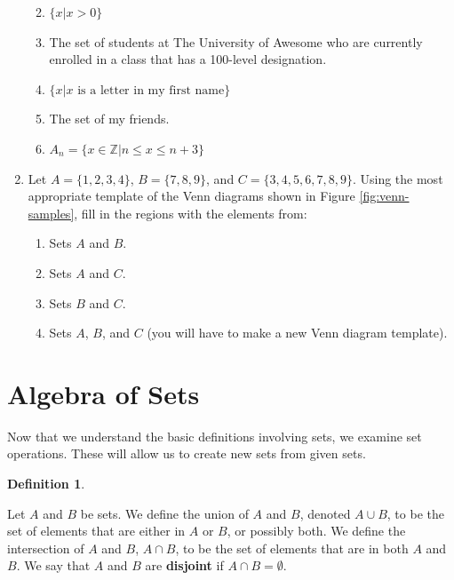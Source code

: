 \documentclass[
]{book}
\theoremstyle{definition}
\newtheorem{definition}{Definition}[chapter]
\theoremstyle{definition}
\theoremstyle{definition}
\theoremstyle{definition}
\theoremstyle{remark}
\begin{document}
\begin{enumerate}
  \begin{enumerate}
  \def\labelenumii{\alph{enumii}.}
  \item
    \(\{x \vert x>0\}\)
  \item
    The set of students at The University of Awesome who are currently enrolled in a class that has a 100-level designation.
  \item
    \(\{x\vert x \textrm{ is a letter in my first name}\}\)
  \item
    The set of my friends.
  \item
    \(A_n=\{x\in \mathbb{Z} \vert n\leq x\leq n+3\}\)
  \end{enumerate}
\item
  Let \(A=\{1, 2, 3, 4\}\), \(B=\{7,8,9\}\), and \(C=\{3,4,5,6,7,8,9\}\). Using the most appropriate template of the Venn diagrams shown in Figure \ref{fig:venn-samples}, fill in the regions with the elements from:

  \begin{enumerate}
  \def\labelenumii{\alph{enumii}.}
  \item
    Sets \(A\) and \(B\).
  \item
    Sets \(A\) and \(C\).
  \item
    Sets \(B\) and \(C\).
  \item
    Sets \(A\), \(B\), and \(C\) (you will have to make a new Venn diagram template).
  \end{enumerate}
\end{enumerate}

\hypertarget{algebra-of-sets}{%
\section{Algebra of Sets}\label{algebra-of-sets}}

Now that we understand the basic definitions involving sets, we examine set operations. These will allow us to create new sets from given sets.

\begin{definition}
\protect\hypertarget{def:unlabeled-div-7}{}\label{def:unlabeled-div-7}

Let \(A\) and \(B\) be sets. We define the union of \(A\) and \(B\), denoted \(A \cup B\), to be the set of elements that are either in \(A\) or \(B\), or possibly both. We define the intersection of \(A\) and \(B\), \(A \cap B\), to be the set of elements that are in both \(A\) and \(B\). We say that \(A\) and \(B\) are \textbf{disjoint} if \(A\cap B = \emptyset\).

\end{definition}
\end{document}
